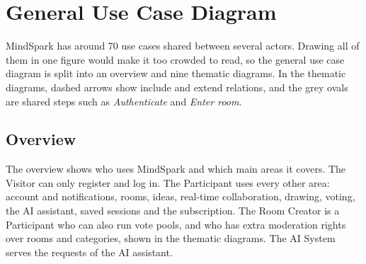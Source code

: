 \documentclass[12pt,a4paper]{report}
\begin{document}
\section{General Use Case Diagram}
\label{sec:usecase}

MindSpark has around 70 use cases shared between several actors. Drawing all of them in one figure would make it too crowded to read, so the general use case diagram is split into an overview and nine thematic diagrams. In the thematic diagrams, dashed arrows show include and extend relations, and the grey ovals are shared steps such as \textit{Authenticate} and \textit{Enter room}.

\clearpage
\subsection{Overview}
\label{subsec:uc-overview}

The overview shows who uses MindSpark and which main areas it covers. The Visitor can only register and log in. The Participant uses every other area: account and notifications, rooms, ideas, real-time collaboration, drawing, voting, the AI assistant, saved sessions and the subscription. The Room Creator is a Participant who can also run vote pools, and who has extra moderation rights over rooms and categories, shown in the thematic diagrams. The AI System serves the requests of the AI assistant.
\end{document}
